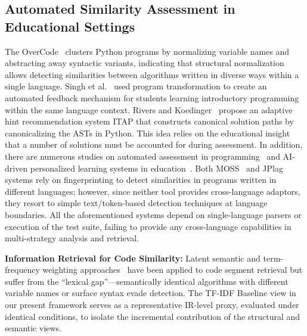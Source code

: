 \subsection{Automated Similarity Assessment in Educational Settings}
The OverCode~\cite{ref_glassman2015} clusters Python programs by normalizing variable names and abstracting away syntactic variants, indicating that structural normalization allows detecting similarities between algorithms written in diverse ways within a single language. Singh et al.~\cite{ref_singh2013} used program transformation to create an automated feedback mechanism for students learning introductory programming within the same language context. Rivers and Koedinger~\cite{ref_rivers2017} propose an adaptive hint recommendation system ITAP that constructs canonical solution paths by canonicalizing the ASTs in Python. This idea relies on the educational insight~\cite{ref_soloway1984} that a number of solutions must be accounted for during assessment. In addition, there are numerous studies on automated assessment in programming~\cite{ref_ihantola2010, ref_paiva2022, ref_parvathy2025, ref_rao2024} and AI-driven personalized learning systems in education~\cite{ref_pradeesh2025, ref_reddy2025}. Both MOSS~\cite{ref_schleimer2003} and JPlag~\cite{ref_prechelt2002} systems rely on fingerprinting to detect similarities in programs written in different languages; however, since neither tool provides cross-language adaptors, they resort to simple text/token-based detection techniques at language boundaries. All the aforementioned systems depend on single-language parsers or execution of the test suite, failing to provide any cross-language capabilities in multi-strategy analysis and retrieval.

\textbf{Information Retrieval for Code Similarity:} Latent semantic and term-frequency weighting approaches~\cite{ref_ir_code_retrieval} have been applied to code segment retrieval but suffer from the ``lexical gap''---semantically identical algorithms with different variable names or surface syntax evade detection. The TF-IDF Baseline view in our present framework serves as a representative IR-level proxy, evaluated under identical conditions, to isolate the incremental contribution of the structural and semantic views.

